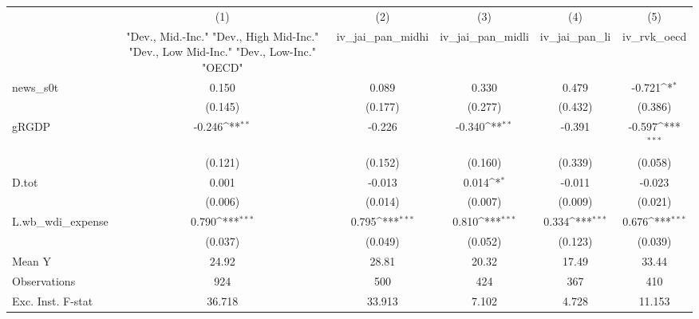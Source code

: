 {
\def\sym#1{\ifmmode^{#1}\else\(^{#1}\)\fi}
\begin{tabular}{l*{5}{c}}
\toprule
            &\multicolumn{1}{c}{(1)}&\multicolumn{1}{c}{(2)}&\multicolumn{1}{c}{(3)}&\multicolumn{1}{c}{(4)}&\multicolumn{1}{c}{(5)}\\
            &\multicolumn{1}{c}{ "Dev., Mid.-Inc." "Dev., High Mid-Inc." "Dev., Low Mid-Inc." "Dev., Low-Inc." "OECD" }&\multicolumn{1}{c}{iv\_jai\_pan\_midhi}&\multicolumn{1}{c}{iv\_jai\_pan\_midli}&\multicolumn{1}{c}{iv\_jai\_pan\_li}&\multicolumn{1}{c}{iv\_rvk\_oecd}\\
\midrule
news\_s0t    &       0.150         &       0.089         &       0.330         &       0.479         &      -0.721\sym{*}  \\
            &     (0.145)         &     (0.177)         &     (0.277)         &     (0.432)         &     (0.386)         \\
\addlinespace
gRGDP       &      -0.246\sym{**} &      -0.226         &      -0.340\sym{**} &      -0.391         &      -0.597\sym{***}\\
            &     (0.121)         &     (0.152)         &     (0.160)         &     (0.339)         &     (0.058)         \\
\addlinespace
D.tot       &       0.001         &      -0.013         &       0.014\sym{*}  &      -0.011         &      -0.023         \\
            &     (0.006)         &     (0.014)         &     (0.007)         &     (0.009)         &     (0.021)         \\
\addlinespace
L.wb\_wdi\_expense&       0.790\sym{***}&       0.795\sym{***}&       0.810\sym{***}&       0.334\sym{***}&       0.676\sym{***}\\
            &     (0.037)         &     (0.049)         &     (0.052)         &     (0.123)         &     (0.039)         \\
\midrule
Mean Y      &       24.92         &       28.81         &       20.32         &       17.49         &       33.44         \\
Observations&         924         &         500         &         424         &         367         &         410         \\
Exc. Inst. F-stat&      36.718         &      33.913         &       7.102         &       4.728         &      11.153         \\
\bottomrule
\end{tabular}
}
